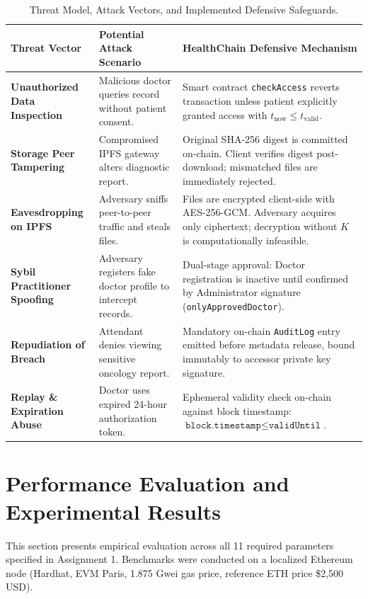 \documentclass[11pt,a4paper]{article}
\begin{document}
\begin{table}[htbp]
\centering
\small
\caption{Threat Model, Attack Vectors, and Implemented Defensive Safeguards.}
\label{tab:security}
\begin{tabularx}{\textwidth}{p{3.2cm}p{4.2cm}X}
\toprule
\textbf{Threat Vector} & \textbf{Potential Attack Scenario} & \textbf{HealthChain Defensive Mechanism} \\
\midrule
\textbf{Unauthorized Data Inspection} & Malicious doctor queries record without patient consent. & Smart contract \texttt{checkAccess} reverts transaction unless patient explicitly granted access with $t_{\text{now}} \le t_{\text{valid}}$. \\
\addlinespace
\textbf{Storage Peer Tampering} & Compromised IPFS gateway alters diagnostic report. & Original SHA-256 digest is committed on-chain. Client verifies digest post-download; mismatched files are immediately rejected. \\
\addlinespace
\textbf{Eavesdropping on IPFS} & Adversary sniffs peer-to-peer traffic and steals files. & Files are encrypted client-side with AES-256-GCM. Adversary acquires only ciphertext; decryption without $K$ is computationally infeasible. \\
\addlinespace
\textbf{Sybil Practitioner Spoofing} & Adversary registers fake doctor profile to intercept records. & Dual-stage approval: Doctor registration is inactive until confirmed by Administrator signature (\texttt{onlyApprovedDoctor}). \\
\addlinespace
\textbf{Repudiation of Breach} & Attendant denies viewing sensitive oncology report. & Mandatory on-chain \texttt{AuditLog} entry emitted before metadata release, bound immutably to accessor private key signature. \\
\addlinespace
\textbf{Replay \& Expiration Abuse} & Doctor uses expired 24-hour authorization token. & Ephemeral validity check on-chain against block timestamp: $\texttt{block.timestamp} \le \texttt{validUntil}$. \\
\bottomrule
\end{tabularx}
\end{table}

\section{Performance Evaluation and Experimental Results}
This section presents empirical evaluation across all 11 required parameters specified in Assignment 1. Benchmarks were conducted on a localized Ethereum node (Hardhat, EVM Paris, 1.875 Gwei gas price, reference ETH price \$2,500 USD).
\end{document}
